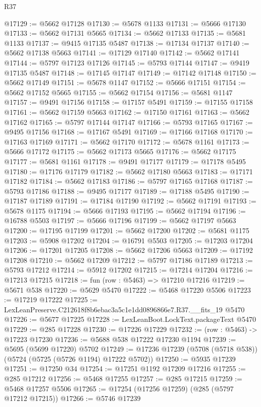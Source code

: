 \begin{lexlean}{R37}
\begin{coremodule}
@17129 := @5662 @17128
@17130 := @5678 @1133
@17131 := @5666 @17130
@17133 := @5662 @17131 @5665
@17134 := @5662 @17133
@17135 := @5681 @1133
@17137 := @9415 @17135 @5487
@17138 := @17134 @17137
@17140 := @5662 @17138 @5663
@17141 := @17129 @17140
@17142 := @5662 @17141
@17144 := @5797 @17123 @17126
@17145 := @5793 @17144
@17147 := @9419 @17135 @5487
@17148 := @17145 @17147
@17149 := @17142 @17148
@17150 := @5662 @17149
@17151 := @5678 @1147
@17152 := @5666 @17151
@17154 := @5662 @17152 @5665
@17155 := @5662 @17154
@17156 := @5681 @1147
@17157 := @9491 @17156
@17158 := @17157 @5491
@17159 := @17155 @17158
@17161 := @5662 @17159 @5663
@17162 := @17150 @17161
@17163 := @5662 @17162
@17165 := @5797 @17144 @17147
@17166 := @5793 @17165
@17167 := @9495 @17156
@17168 := @17167 @5491
@17169 := @17166 @17168
@17170 := @17163 @17169
@17171 := @5662 @17170
@17172 := @5678 @1161
@17173 := @5666 @17172
@17175 := @5662 @17173 @5665
@17176 := @5662 @17175
@17177 := @5681 @1161
@17178 := @9491 @17177
@17179 := @17178 @5495
@17180 := @17176 @17179
@17182 := @5662 @17180 @5663
@17183 := @17171 @17182
@17184 := @5662 @17183
@17186 := @5797 @17165 @17168
@17187 := @5793 @17186
@17188 := @9495 @17177
@17189 := @17188 @5495
@17190 := @17187 @17189
@17191 := @17184 @17190
@17192 := @5662 @17191
@17193 := @5678 @1175
@17194 := @5666 @17193
@17195 := @5662 @17194
@17196 := @16788 @5503
@17197 := @5666 @17196
@17199 := @5662 @17197 @5663
@17200 := @17195 @17199
@17201 := @5662 @17200
@17202 := @5681 @1175
@17203 := @5908 @17202
@17204 := @16791 @5503
@17205 := @17203 @17204
@17206 := @17201 @17205
@17208 := @5662 @17206 @5663
@17209 := @17192 @17208
@17210 := @5662 @17209
@17212 := @5797 @17186 @17189
@17213 := @5793 @17212
@17214 := @5912 @17202
@17215 := @17214 @17204
@17216 := @17213 @17215
@17218 := fun (row : @5463) => @17210 @17216
@17219 := @5671 @538
@17220 := @5629 @5470
@17222 := @5468 @17220 @5506
@17223 := @17219 @17222
@17225 := LexLeanPreserve.C212618f8b6ebac3a5c1e1dd0896866e7.R37.__fits_19 @5470
@17226 := @5677 @17225
@17228 := LexLeanBoot.LockText.packageText @5470
@17229 := @285 @17228
@17230 := @17226 @17229
@17232 := (row : @5463) -> @17223 @17230
@17236 := @5688 @538 @17222 @17230 @1194
@17239 := @5695 (@5699 @17220) @5702
@17249 := @17236 @17239 (@5708 (@5718 @538)) (@5724 (@5725 (@5726 @1194) @17222 @5702))
@17250 := @5935 @17239
@17251 := @17250 @34
@17254 := @17251 @1192 @17209 @17216
@17255 := @285 @17212
@17256 := @5468 @17255
@17257 := @285 @17215
@17259 := @5468 @17257 @5506
@17265 := @17254 (@17256 @17259) (@285 (@5797 @17212 @17215))
@17266 := @5746 @17239

\end{coremodule}
\end{lexlean}
